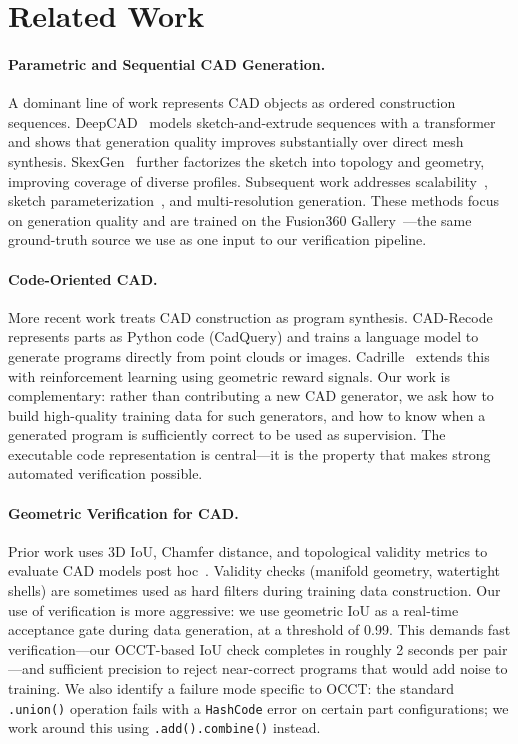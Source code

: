 \section{Related Work}
\label{sec:related}

\paragraph{Parametric and Sequential CAD Generation.}
A dominant line of work represents CAD objects as ordered construction sequences.
DeepCAD~\cite{deepcad} models sketch-and-extrude sequences with a transformer and shows that generation quality improves substantially over direct mesh synthesis.
SkexGen~\cite{skexgen} further factorizes the sketch into topology and geometry, improving coverage of diverse profiles.
Subsequent work addresses scalability~\cite{cadsignet}, sketch parameterization~\cite{brepgen}, and multi-resolution generation.
These methods focus on generation quality and are trained on the Fusion360 Gallery~\cite{fusion360gallery}---the same ground-truth source we use as one input to our verification pipeline.

\paragraph{Code-Oriented CAD.}
More recent work treats CAD construction as program synthesis.
CAD-Recode~\cite{cadrecode} represents parts as Python code (CadQuery) and trains a language model to generate programs directly from point clouds or images.
Cadrille~\cite{cadrille} extends this with reinforcement learning using geometric reward signals.
Our work is complementary: rather than contributing a new CAD generator, we ask how to build high-quality training data for such generators, and how to know when a generated program is sufficiently correct to be used as supervision.
The executable code representation is central---it is the property that makes strong automated verification possible.

\paragraph{Geometric Verification for CAD.}
Prior work uses 3D IoU, Chamfer distance, and topological validity metrics to evaluate CAD models post hoc~\cite{deepcad,cadrecode}.
Validity checks (manifold geometry, watertight shells) are sometimes used as hard filters during training data construction.
Our use of verification is more aggressive: we use geometric IoU as a real-time acceptance gate during data generation, at a threshold of 0.99.
This demands fast verification---our OCCT-based IoU check completes in roughly 2 seconds per pair---and sufficient precision to reject near-correct programs that would add noise to training.
We also identify a failure mode specific to OCCT: the standard \texttt{.union()} operation fails with a \texttt{HashCode} error on certain part configurations; we work around this using \texttt{.add().combine()} instead.


